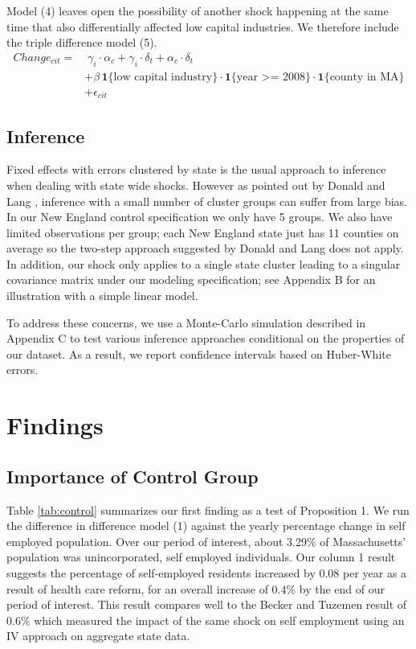 Model (4) leaves open the possibility of another shock happening at the same time that also differentially affected low capital industries. We therefore include the triple difference model (5). 
\begin{align}
Change_{cit} = & \; \gamma_i \cdot \alpha_c + \gamma_i \cdot \delta_t +  \alpha_c \cdot \delta_t \nonumber   \\
& + \beta \, \mathbf{1}\{\text{low capital industry}\} \cdot \mathbf{1}\{\text{year >= 2008}\}  \cdot \mathbf{1}\{\text{county in MA}\} \nonumber  \\
& + \epsilon_{cit}
\end{align}

\section{Inference}

Fixed effects with errors clustered by state is the usual approach to inference when dealing with state wide shocks. However as pointed out by Donald and Lang \cite{donald}, inference with a small number of cluster groups can suffer from large bias. In our New England control specification we only have 5 groups. We also have limited observations per group; each New England state just has 11 counties on average so the two-step approach suggested by Donald and Lang does not apply. In addition, our shock only applies to a single state cluster leading to a singular covariance matrix under our modeling specification; see Appendix B for an illustration with a simple linear model. 

To address these concerns, we use a Monte-Carlo simulation described in Appendix C to test various inference approaches conditional on the properties of our dataset. As a result, we report confidence intervals based on Huber-White errors. 

\chapter{Findings}
\label{sec:results}

\section{Importance of Control Group}

Table \ref{tab:control} summarizes our first finding as a test of Proposition 1. We run the difference in difference model (1) against the yearly percentage change in self employed population. Over our period of interest, about 3.29\% of Massachusetts' population was unincorporated, self employed individuals. Our column 1 result suggests the percentage of self-employed residents increased by 0.08 per year as a result of health care reform, for an overall increase of 0.4\% by the end of our period of interest. This result compares well to the Becker and Tuzemen \cite{tuzemen} result of 0.6\% which measured the impact of the same shock on self employment using an IV approach on aggregate state data. 

